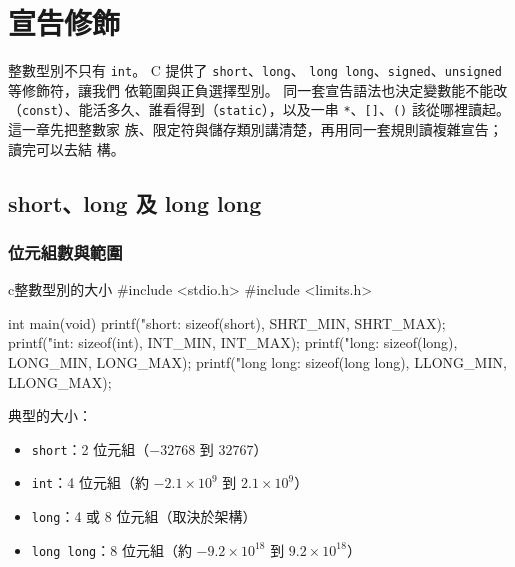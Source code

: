 
\chapter{宣告修飾}
\label{ch:declarationmodifiers}

整數型別不只有 \texttt{int}。 C 提供了 \texttt{short}、\texttt{long}、
\texttt{long long}、\texttt{signed}、\texttt{unsigned} 等修飾符，讓我們
依範圍與正負選擇型別。 同一套宣告語法也決定變數能不能改
（\texttt{const}）、能活多久、誰看得到（\texttt{static}），以及一串
\texttt{*}、\texttt{[]}、\texttt{()} 該從哪裡讀起。 這一章先把整數家
族、限定符與儲存類別講清楚，再用同一套規則讀複雜宣告；讀完可以去結
構。

\section{short、long 及 long long}
\label{sec:decl-int-sizes}

\subsection{位元組數與範圍}

\begin{code}{c}{整數型別的大小}
#include <stdio.h>
#include <limits.h>

int main(void) {
    printf("short: %
           sizeof(short), SHRT_MIN, SHRT_MAX);
    printf("int: %
           sizeof(int), INT_MIN, INT_MAX);
    printf("long: %
           sizeof(long), LONG_MIN, LONG_MAX);
    printf("long long: %
           sizeof(long long), LLONG_MIN, LLONG_MAX);
}
\end{code}

典型的大小：
\begin{itemize}
\item \texttt{short}：2 位元組（$-32768$ 到 $32767$）
\item \texttt{int}：4 位元組（約 $-2.1 \times 10^9$ 到 $2.1 \times 10^9$）
\item \texttt{long}：4 或 8 位元組（取決於架構）
\item \texttt{long long}：8 位元組（約 $-9.2 \times 10^{18}$ 到 $9.2 \times 10^{18}$）
\end{itemize}

